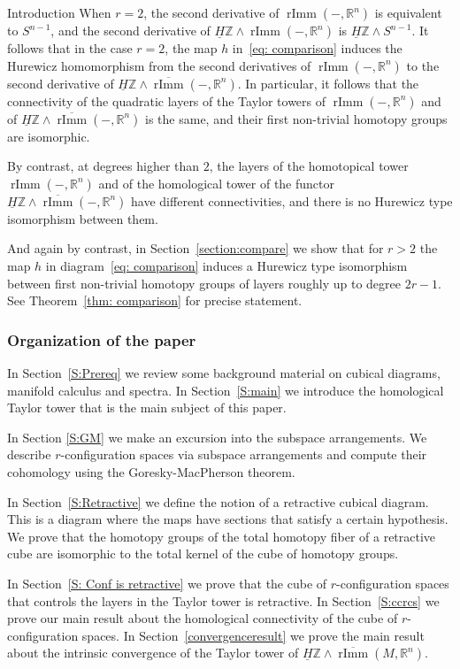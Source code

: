 \documentclass[12pt]{amsart}
\newcommand{\R}{{\mathbb R}}
\newcommand{\Z}{{\mathbb Z}}
\newcommand{\rImm}{\operatorname{rImm}}
\newcommand{\rbar}{\overline{\rImm}}
\newcommand{\HZ}{\underline{H}\Z}
\theoremstyle{plain}
\theoremstyle{definition}
\theoremstyle{remark}
\begin{document}
\begin{section}{Introduction}
When $r=2$, the second derivative of $\rImm(-, \R^n)$ is equivalent to $S^{n-1}$, and the second derivative of $\HZ\wedge \rImm(-, \R^n)$ is $\HZ\wedge S^{n-1}$. It follows that in the case $r=2$, the map $h$ in~\eqref{eq: comparison} induces the Hurewicz homomorphism from the second derivatives of $\rImm(-, \R^n)$ to the second derivative of $\HZ\wedge \rbar(-, \R^n)$. In particular, it follows that the connectivity of the quadratic layers of the Taylor towers of $\rImm(-, \R^n)$ and of $\HZ\wedge \rbar(-, \R^n)$ is the same, and their first non-trivial homotopy groups are isomorphic. 

By contrast, at degrees higher than $2$, the layers of the homotopical tower $\rImm(-, \R^n)$ and of the homological tower of the functor $\HZ\wedge \rbar(-, \R^n)$ have different connectivities, and there is no Hurewicz type isomorphism between them.

And again by contrast, in Section~\ref{section:compare} we show that for $r>2$ the map $h$ in diagram~\eqref{eq: comparison} induces a Hurewicz type isomorphism between first non-trivial homotopy groups of layers roughly up to degree $2r-1$. See Theorem~\ref{thm: comparison} for precise statement.%

\subsubsection*{Organization of the paper}
In Section~\ref{S:Prereq} we review some background material on cubical diagrams, manifold calculus and spectra. In Section~\ref{S:main} we introduce the homological Taylor tower that is the main subject of this paper. 

In Section \ref{S:GM} we make an excursion into the subspace arrangements. We describe $r$-configuration spaces via subspace arrangements and compute their cohomology using the Goresky-MacPherson theorem. 

In Section~\ref{S:Retractive} we define the notion of a retractive cubical diagram. This is a diagram where the maps have sections that satisfy a certain hypothesis. We prove that the homotopy groups of the total homotopy fiber of a retractive cube are isomorphic to the total kernel of the cube of homotopy groups.

In Section~\ref{S: Conf is retractive} we prove that the cube of $r$-configuration spaces that controls the layers in the Taylor tower is retractive. In Section~\ref{S:ccrcs} we prove our main result about the homological connectivity of the cube of $r$-configuration spaces. In Section~\ref{convergenceresult} we prove the main result about the intrinsic convergence of the Taylor tower of $\HZ\wedge \rbar(M, \R^n)$.


\end{section}
\end{document}

